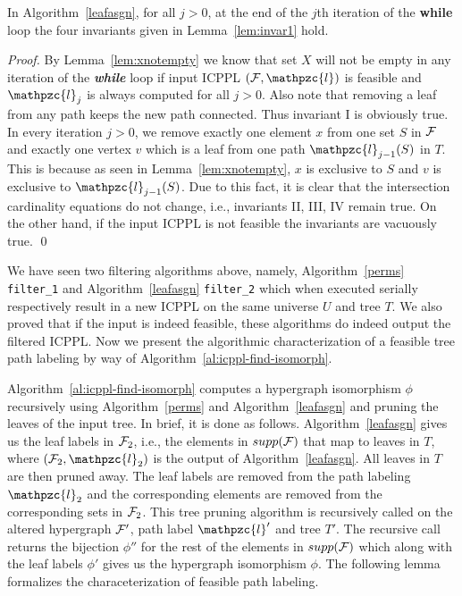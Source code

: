 \documentclass[11pt,
               envcountsect,
               envcountsame]
               {../lib/llncs2e/llncs}
\def\cF{{\cal F}}
\def\cl{\mathpzc{l}}
\def\xnoindent{\noindent} %
\begin{document}
\begin{lemma}
  \label{lem:invar3}
  In Algorithm~\ref{leafasgn}, for all $j > 0$, at the end of the
  $j$th iteration of the {\bf while} loop the four invariants given in
  Lemma~\ref{lem:invar1} hold.
\end{lemma}
\begin{proof}
  By Lemma~\ref{lem:xnotempty} we know that set $X$ will not be empty
  in any iteration of the {\em \bf while} loop if input ICPPL $(\cF,
  \cl)$ is feasible and $\cl_j$ is always computed for all $j >
  0$. Also note that removing a leaf from any path keeps the new path
  connected. Thus invariant I is obviously true. In every iteration $j
  > 0$, we remove exactly one element $x$ from one set $S$ in $\cF$
  and exactly one vertex $v$ which is a leaf from one path
  $\cl_{j-1}(S)$ in $T$. This is because as seen in
  Lemma~\ref{lem:xnotempty}, $x$ is exclusive to $S$ and $v$ is
  exclusive to $\cl_{j-1}(S)$. Due to this fact, it is clear that the
  intersection cardinality equations do not change, i.e., invariants
  II, III, IV remain true. On the other hand, if the input ICPPL is
  not feasible the invariants are vacuously true. \qed
\end{proof}



\xnoindent We have seen two filtering algorithms above, namely,
Algorithm~\ref{perms} {\tt filter\_1} and Algorithm~\ref{leafasgn}
{\tt filter\_2} which when executed serially respectively result in a
new ICPPL on the same universe $U$ and tree $T$. We also proved that
if the input is indeed feasible, these algorithms do indeed output the
filtered ICPPL. Now we present the algorithmic characterization of a
feasible tree path labeling by way of Algorithm~\ref{al:icppl-find-isomorph}.

\xnoindent Algorithm~\ref{al:icppl-find-isomorph} computes a
hypergraph isomorphism $\phi$ recursively using Algorithm~\ref{perms}
and Algorithm~\ref{leafasgn} and pruning the leaves of the input
tree. In brief, it is done as follows. Algorithm~\ref{leafasgn} gives
us the leaf labels in $\cF_2$, i.e., the elements in $supp(\cF)$ that
map to leaves in $T$, where $(\cF_2, \cl_2)$ is the output of
Algorithm~\ref{leafasgn}. All leaves in $T$ are then pruned away. The
leaf labels are removed from the path labeling $\cl_2$ and the
corresponding elements are removed from the corresponding sets in
$\cF_2$. This tree pruning algorithm is recursively called on the
altered hypergraph $\cF'$, path label $\cl'$ and tree $T'$. The
recursive call returns the bijection $\phi''$ for the rest of the
elements in $supp(\cF)$ which along with the leaf labels $\phi'$ gives
us the hypergraph isomorphism $\phi$.  The following lemma formalizes
the characeterization of feasible path labeling.
\end{document}
